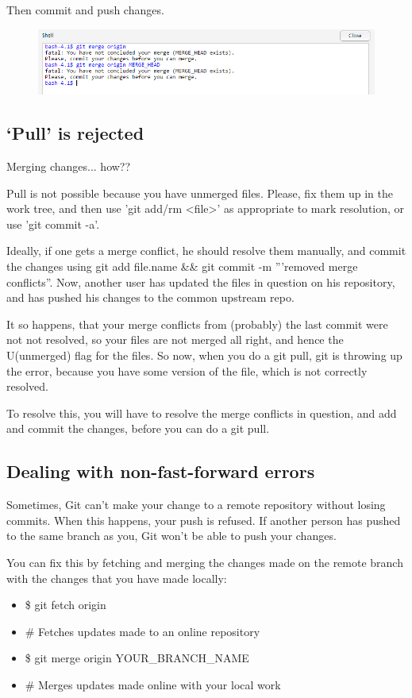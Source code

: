 \documentclass[12pt]{../SOP3_beta}
\begin{document}
\NP Then commit and push changes. 

\begin{figure}
\includegraphics{graphics/MergeError.jpg}
\end{figure}

\subsection{`Pull' is rejected}

\NP Merging changes... how??

Pull is not possible because you have unmerged files.
Please, fix them up in the work tree, and then use 'git add/rm <file>'
as appropriate to mark resolution, or use 'git commit -a'.

Ideally, if one gets a merge conflict, he should resolve them manually, and commit the changes using git add file.name \&\& git commit -m '''removed merge conflicts''. Now, another user has updated the files in question on his repository, and has pushed his changes to the common upstream repo.

It so happens, that your merge conflicts from (probably) the last commit were not not resolved, so your files are not merged all right, and hence the U(unmerged) flag for the files. So now, when you do a git pull, git is throwing up the error, because you have some version of the file, which is not correctly resolved.

To resolve this, you will have to resolve the merge conflicts in question, and add and commit the changes, before you can do a git pull.

\subsection{Dealing with non-fast-forward errors}

\NP Sometimes, Git can't make your change to a remote repository without losing commits. When this happens, your push is refused. If another person has pushed to the same branch as you, Git won't be able to push your changes.

\NP You can fix this by fetching and merging the changes made on the remote branch with the changes that you have made locally:
\begin{itemize}
  \item \$ git fetch origin
  \item \# Fetches updates made to an online repository
  \item \$ git merge origin YOUR\_BRANCH\_NAME
  \item \# Merges updates made online with your local work
\end{itemize}
\end{document}
